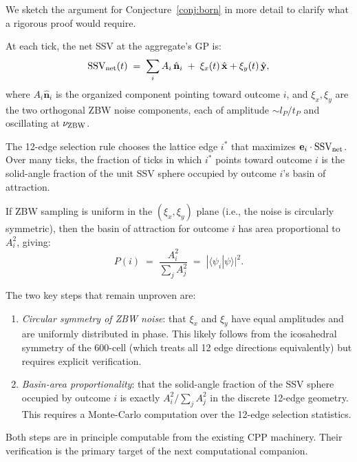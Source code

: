 \documentclass[12pt]{article}
\newcommand{\lP}{l_P}
\newcommand{\tP}{t_P}
\newcommand{\SSV}{\text{SSV}}
\begin{document}
We sketch the argument for Conjecture~\ref{conj:born} in more detail to
clarify what a rigorous proof would require.

At each tick, the net SSV at the aggregate's GP is:
\begin{equation}
  \SSV_{\rm net}(t) \;=\; \sum_i A_i\,\hat{\mathbf{n}}_i
  \;+\; \xi_x(t)\,\hat{\mathbf{x}} + \xi_y(t)\,\hat{\mathbf{y}},
  \label{eq:netSSV}
\end{equation}
where $A_i\hat{\mathbf{n}}_i$ is the organized component pointing toward
outcome $i$, and $\xi_x, \xi_y$ are the two orthogonal ZBW noise components,
each of amplitude $\sim \lP/\tP$ and oscillating at $\nu_{\rm ZBW}$.

The 12-edge selection rule chooses the lattice edge $i^*$ that maximizes
$\mathbf{e}_i\cdot\SSV_{\rm net}$.  Over many ticks, the fraction of ticks
in which $i^*$ points toward outcome $i$ is the solid-angle fraction of the
unit SSV sphere occupied by outcome $i$'s basin of attraction.

If ZBW sampling is uniform in the $(\xi_x, \xi_y)$ plane (i.e., the noise
is circularly symmetric), then the basin of attraction for outcome $i$ has
area proportional to $A_i^2$, giving:
\begin{equation}
  P(i) \;=\; \frac{A_i^2}{\sum_j A_j^2}
  \;=\; |\langle\psi_i|\psi\rangle|^2.
  \label{eq:born_sketch}
\end{equation}

The two key steps that remain unproven are:
\begin{enumerate}[noitemsep]
  \item \emph{Circular symmetry of ZBW noise}: that $\xi_x$ and $\xi_y$
    have equal amplitudes and are uniformly distributed in phase.  This
    likely follows from the icosahedral symmetry of the 600-cell (which
    treats all 12 edge directions equivalently) but requires explicit
    verification.
  \item \emph{Basin-area proportionality}: that the solid-angle fraction of
    the SSV sphere occupied by outcome $i$ is exactly $A_i^2/\sum_j A_j^2$
    in the discrete 12-edge geometry.  This requires a Monte-Carlo
    computation over the 12-edge selection statistics.
\end{enumerate}

Both steps are in principle computable from the existing CPP machinery.
Their verification is the primary target of the next computational companion.

\end{document}
